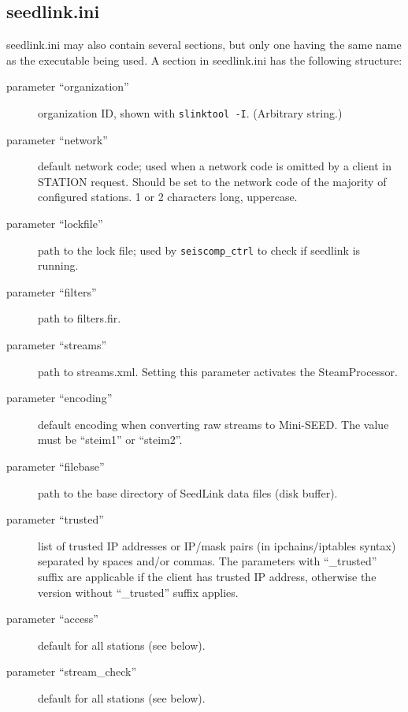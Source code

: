 \documentclass[11pt,a4paper,titlepage]{article}
\begin{document}
\subsection{seedlink.ini}\label{seedlinkini}

seedlink.ini may also contain several sections, but only one having the
same name as the executable being used. A section in seedlink.ini has the
following structure:
\begin{description}
\item[parameter ``organization''] organization ID, shown with
\verb+slinktool -I+. (Arbitrary string.)

\item[parameter ``network''] default network code; used when a network code
is omitted by a client in STATION request. Should be set to the network
code of the majority of configured stations. 1 or 2 characters long,
uppercase.

\item[parameter ``lockfile''] path to the lock file; used by
\verb+seiscomp_ctrl+ to check if seedlink is running.

\item[parameter ``filters''] path to filters.fir.

\item[parameter ``streams''] path to streams.xml. Setting this parameter
activates the SteamProcessor.

\item[parameter ``encoding'' ] default encoding when converting
raw streams to Mini-SEED. The value must be ``steim1'' or ``steim2''.

\item[parameter ``filebase''] path to the base directory of SeedLink data
files (disk buffer).

\item[parameter ``trusted'' ] list of trusted IP addresses
or IP/mask pairs (in ipchains/iptables syntax) separated by spaces and/or
commas. The parameters with ``\_trusted'' suffix are applicable if the
client has trusted IP address, otherwise the version without ``\_trusted''
suffix applies.

\item[parameter ``access'' ] default for all stations (see
below).

\item[parameter ``stream\_check'' ] default for all stations
(see below).


\end{description}
\end{document}
